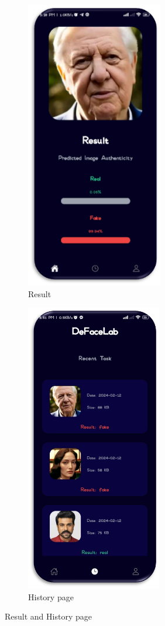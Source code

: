 \begin{figure}[ht]
    \centering
    \begin{subfigure}[b]{0.45\textwidth}
        \centering
        \includegraphics[height=5in]{img/Results.png}
        \caption{{Result}}
    \end{subfigure}
    \hfill
    \begin{subfigure}[b]{0.45\textwidth}
        \centering
        \includegraphics[height=5in]{img/Historyv2.png}
        \caption{{History page}}
    \end{subfigure}
    \caption{Result and History page}
\end{figure}
